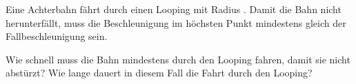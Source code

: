 Eine Achterbahn fährt durch einen Looping mit Radius \rAbO. Damit die Bahn nicht herunterfällt, muss die Beschleunigung im höchsten Punkt mindestens gleich der Fallbeschleunigung sein.

\begin{abcliste}
\abc Wie schnell muss die Bahn mindestens durch den Looping fahren, damit sie nicht abstürzt?
\abc Wie lange dauert in diesem Fall die Fahrt durch den Looping?
\end{abcliste}
